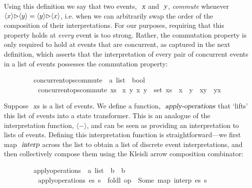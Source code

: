 \documentclass[acmlarge,review,anonymous]{acmart}\settopmatter{printfolios=true}
\begin{document}
Using this definition we say that two events, $\isa{x}$ and $\isa{y}$, \emph{commute} whenever $\langle x \rangle {\emph{$\rhd$}} \langle y \rangle = \langle y \rangle {\emph{$\rhd$}} \langle x \rangle$, i.e. when we can arbitrarily swap the order of the composition of their interpretations.
For our purposes, requiring that this property holds at \emph{every} event is too strong.
Rather, the commutation property is only required to hold at events that are concurrent, as captured in the next definition, which asserts that the interpretation of every pair of concurrent events in a list of events possesses the commutation property:
\\
\begin{isabellebody}
\ \ \ \ \ \ \ \  concurrent{\isacharunderscore}ops{\isacharunderscore}commute\ {\isacharcolon}{\isacharcolon}\ {\isachardoublequoteopen}{\isacharprime}a\ list\ {\isasymRightarrow}\ bool{\isachardoublequoteclose}\ \isanewline
\ \ \ \ \ \ \ \ \ \ {\isachardoublequoteopen}concurrent{\isacharunderscore}ops{\isacharunderscore}commute\ xs\ {\isasymequiv} {\isasymforall}x\ y{\isachardot}\ {\isacharbraceleft}x{\isacharcomma}\ y{\isacharbraceright}\ {\isasymsubseteq}\ set\ xs\ {\isasymlongrightarrow}\ x\ {\isasymparallel}\ y\ {\isasymlongrightarrow}\ {\isasymlangle}x{\isasymrangle}{\isasymrhd}{\isasymlangle}y{\isasymrangle}\ {\isacharequal}\ {\isasymlangle}y{\isasymrangle}{\isasymrhd}{\isasymlangle}x{\isasymrangle}{\isachardoublequoteclose}
\end{isabellebody}
\vspace{\baselineskip}
Suppose $\isa{xs}$ is a list of events.
We define a function, $\isa{apply-operations}$ that `lifts' this list of events into a state transformer.
This is an analogue of the interpretation function, $\langle-\rangle$, and can be seen as providing an interpretation to lists of events.
Defining this interpretation function is straightforward---we first map $\isa{interp}$ across the list to obtain a list of discrete event interpretations, and then collectively compose them using the Kleisli arrow composition combinator:
\\
\begin{isabellebody}
\ \ \ \ \ \ \ \  apply{\isacharunderscore}operations\ {\isacharcolon}{\isacharcolon}\ {\isachardoublequoteopen}{\isacharprime}a\ list\ {\isasymRightarrow}\ {\isacharprime}b\ {\isasymrightharpoonup}\ {\isacharprime}b{\isachardoublequoteclose}\ \isanewline
\ \ \ \ \ \ \ \ \ \ {\isachardoublequoteopen}apply{\isacharunderscore}operations\ es\ s\ {\isasymequiv}\ {\isacharparenleft}foldl\ {\isacharparenleft}op\ {\isasymrhd}{\isacharparenright}\ Some\ {\isacharparenleft}map\ interp\ es{\isacharparenright}{\isacharparenright}\ s{\isachardoublequoteclose}
\end{isabellebody}
\end{document}
